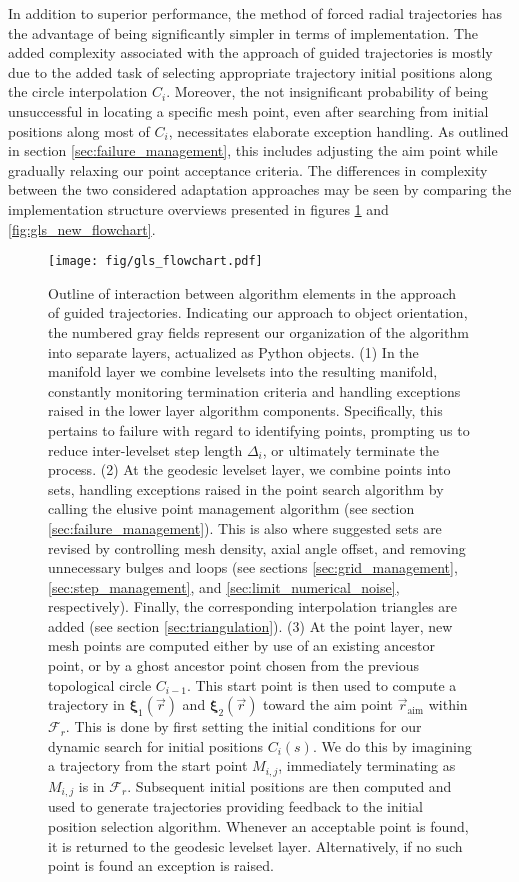 In addition to superior performance, the method of forced radial trajectories has the advantage of being significantly simpler in terms of implementation. The added complexity associated with the approach of guided trajectories is mostly due to the added task of selecting appropriate trajectory initial positions along the circle interpolation $C_i$. Moreover, the not insignificant probability of being unsuccessful in locating a specific mesh point, even after searching from initial positions along most of $C_i$, necessitates elaborate exception handling. As outlined in section \ref{sec:failure_management}, this includes adjusting the aim point while gradually relaxing our point acceptance criteria. The differences in complexity between the two considered adaptation approaches may be seen by comparing the implementation structure overviews presented in figures \ref{fig:gls_flowchart} and \ref{fig:gls_new_flowchart}.

\begin{figure}[h!] 
\centering
\texttt{[image: fig/gls\_flowchart.pdf]}
\caption{Outline of interaction between algorithm elements in the approach of guided trajectories. Indicating our approach to object orientation, the numbered gray fields represent our organization of the algorithm into separate layers, actualized as Python objects. (1) In the manifold layer we combine levelsets into the resulting manifold, constantly monitoring termination criteria and handling exceptions raised in the lower layer algorithm components. Specifically, this pertains to failure with regard to identifying points, prompting us to reduce inter-levelset step length $\Delta_i$, or ultimately terminate the process. (2) At the geodesic levelset layer, we combine points into sets, handling exceptions raised in the point search algorithm by calling the elusive point management algorithm (see section \ref{sec:failure_management}). This is also where suggested sets are revised by controlling mesh density, axial angle offset, and removing unnecessary bulges and loops (see sections \ref{sec:grid_management}, \ref{sec:step_management}, and \ref{sec:limit_numerical_noise}, respectively). Finally, the corresponding interpolation triangles are added (see section \ref{sec:triangulation}). (3) At the point layer, new mesh points are computed either by use of an existing ancestor point, or by a ghost ancestor point chosen from the previous topological circle $C_{i-1}$. This start point is then used to compute a trajectory in $\bm{\xi}_1(\vec{r})$ and $\bm{\xi}_2(\vec{r})$ toward the aim point $\vec{r}_{\text{aim}}$ within $\mathcal{F}_r$. This is done by first setting the initial conditions for our dynamic search for initial positions $C_i(s)$. We do this by imagining a trajectory from the start point $M_{i,j}$, immediately terminating as $M_{i,j}$ is in $\mathcal{F}_r$. Subsequent initial positions are then computed and used to generate trajectories providing feedback to the initial position selection algorithm. Whenever an acceptable point is found, it is returned to the geodesic levelset layer. Alternatively, if no such point is found an exception is raised.}\label{fig:gls_flowchart}
\end{figure}

